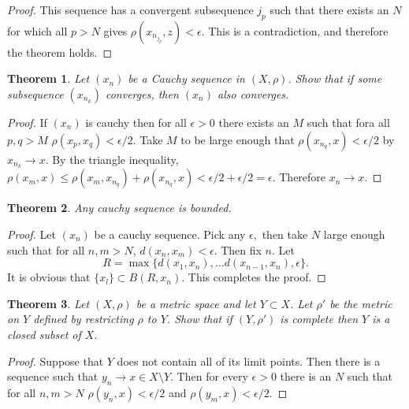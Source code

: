 \documentclass[letter]{article}
\newtheorem{theorem}{Theorem}
\newenvironment{menumerate}{%
  \edef\backupindent{\the\parindent}%
  \enumerate%
  \setlength{\parindent}{\backupindent}%
}{\endenumerate}
\begin{document}
\begin{menumerate}
\begin{proof}
	   	This sequence has a convergent subsequence $j_p$ such that there exists an $N$ for which all $p>N$ gives $\rho(x_{n_{j_p}}, z) < \epsilon$. This is a contradiction, and therefore the theorem holds.
	   	\end{proof}
	   	\item 
	   	\begin{theorem}
	   	 Let $(x_n)$ be a Cauchy sequence in $(X,\rho)$. Show that if some subsequence $(x_{n_k})$ converges, then $(x_n)$ also converges.
	   	\end{theorem}
	   	\begin{proof}
			If $(x_n)$ is cauchy then for all $\epsilon > 0$ there exists an $M$ such that fora all $p,q > M$ $\rho(x_p, x_q) < \epsilon/2.$ Take $M$ to be large enough that $\rho(x_{n_q}, x) < \epsilon/2$ by $x_{n_k} \to x.$ By the triangle inequality, $\rho(x_m, x) \leq \rho(x_m, x_{n_q}) + \rho(x_{n_q}, x) < \epsilon/2 + \epsilon/2 = \epsilon$. Therefore $x_n \to x$.	
	   	\end{proof}
		\item 
		\begin{theorem}
			Any cauchy sequence is bounded.   
		\end{theorem}
		\begin{proof}
			Let $(x_n)$ be a cauchy sequence. Pick any $\epsilon,$ then take $N$ large enough such that for all $n,m > N$, $d(x_n, x_m) < \epsilon.$ Then fix $n.$ Let \begin{equation}
				R = \max\{d(x_1, x_n), \dots d(x_{n-1},x_n), \epsilon\}.		
			\end{equation}
			It is obvious that $\{x_l\} \subset B(R, x_n)$. This completes the proof.
		\end{proof}
		\item 
		\begin{theorem}
			Let $(X, \rho)$ be a metric space and let $Y \subset X$. Let $\rho'$ be the metric on $Y$ defined by restricting $\rho$ to $Y$. Show that if $(Y, \rho')$  is complete then $Y$ is a closed subset of $X.$
		\end{theorem}
		\begin{proof}
			Suppose that $Y$ does not contain all of its limit points. Then there is a sequence such that $y_n \to x \in X \setminus Y$. Then for every $\epsilon > 0$ there is an $N$ such that for all $n, m > N$ $\rho(y_n, x) < \epsilon/2$ and $\rho(y_m, x) <  \epsilon/2.$


\end{proof}
\end{menumerate}
\end{document}
